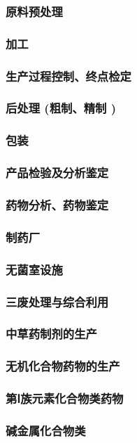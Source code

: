 \documentclass[UTF8]{../../ApplicationUniverse}
\begin{document}
        \subsubsection{原料预处理}
        \subsubsection{加工}
        \subsubsection{生产过程控制、终点检定}
        \subsubsection{后处理 (粗制、精制 )}
        \subsubsection{包装}
    \subsubsection{产品检验及分析鉴定}
        \subsubsection{药物分析、药物鉴定}
    \subsubsection{制药厂}
        \subsubsection{无菌室设施}
    \subsubsection{三废处理与综合利用}
\subsubsection{中草药制剂的生产}
\subsubsection{无机化合物药物的生产}
    \subsubsection{第Ⅰ族元素化合物类药物}
        \subsubsection{碱金属化合物类}
\end{document}
